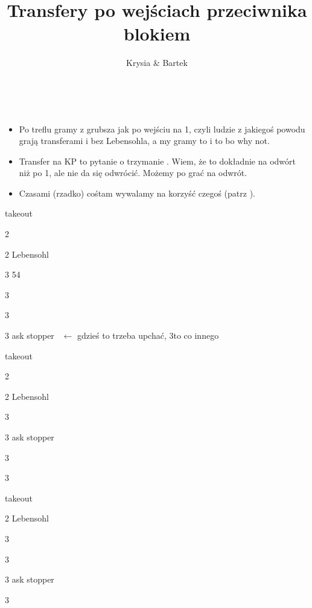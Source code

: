 \documentclass[12pt, a4paper]{article}
\title{\vspace{-2cm}Transfery po wejściach przeciwnika blokiem}
\date{}
\author{Krysia \& Bartek}
\begin{document}
\maketitle

{\Huge{\clubs}}\\
\begin{itemize}
    \item Po treflu gramy z grubsza jak po wejściu 
    na 1\nt, czyli ludzie z jakiegoś powodu grają transferami i bez Lebensohla,
    a my gramy to i to bo why not.
    \item Transfer na KP to pytanie o trzymanie \gf. Wiem, że
    to dokładnie na odwórt niż po 1\nt, ale nie da się odwrócić.
    Możemy po \nt grać na odwrót.
    \item Czasami (rzadko) cośtam wywalamy
    na korzyść czegoś (patrz {\color{BurntOrange}{\textbf{\large!}}}).
\end{itemize}

\sequence{{1\clubs}{(2\diams)}}
\begin{options}[1]
    \item[\dbl] takeout
    \item[2\major] \nat\ \nf
    \item[2\nt] Lebensohl
    \item[3\clubs] 54\major\ \gf \imp
    \item[3\diams] \then\ \hearts\ \invp
    \item[3\hearts] \then\ \spades\ \invp
    \item[3\spades] ask \diams stopper \gf\ $\leftarrow$ gdzieś to trzeba upchać, 3\clubs to co innego
\end{options}

\sequence{{1\clubs}{(2\hearts)}}
\begin{options}[1]
    \item[\dbl] takeout
    \item[2\spades] \nat\ \nf
    \item[2\nt] Lebensohl
    \item[3\clubs] \then\ \diams\ \invp
    \item[3\diams] ask \hearts stopper \gf\
    \item[3\hearts] \then\ \spades\ \invp
    \item[3\spades] \minor \imp
\end{options}

\sequence{{1\clubs}{(2\spades)}}
\begin{options}[1]
    \item[\dbl] takeout
    \item[2\nt] Lebensohl
    \item[3\clubs] \then\ \diams\ \invp
    \item[3\diams] \then\ \hearts\ \invp
    \item[3\hearts] ask \spades stopper \gf\
    \item[3\spades] \minor \imp
\end{options}
\end{document}
